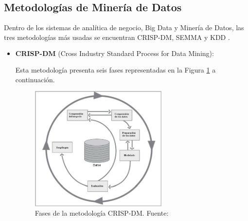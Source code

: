 \clearpage

\subsection{Metodologías de Minería de Datos}

Dentro de los sistemas de analítica de negocio, Big Data y Minería de Datos, las tres metodologías más usadas se encuentran CRISP-DM, SEMMA y KDD \parencite{tec_braulio2015metodologiasdm}.
\begin{itemize}
	\item \textbf{CRISP-DM} (Cross Industry Standard Process for Data Mining):
	
	Esta metodología presenta seis fases representadas en la Figura \ref{2:fig7} a continuación.
	\begin{figure}[h]
		\begin{center}
			\includegraphics[width=0.65\textwidth]{2/figures/crispdm.jpg}
			\caption{Fases de la metodología CRISP-DM. Fuente: \cite{tec_braulio2015metodologiasdm}}
			\label{2:fig7}
		\end{center}
	\end{figure}
		

\end{itemize}
